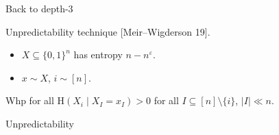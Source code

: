 \begin{frame}{Back to depth-$3$}

    Unpredictability technique [Meir--Wigderson 19].
    \pause
    \begin{itemize}
        \item $X \subseteq \{0, 1\}^n$ has entropy $n - n^{\varepsilon}$.
        \item $x \sim X$, $i \sim [n]$.
    \end{itemize}
    \pause
    Whp for all $\mathrm{H}(X_i \mid X_I = x_I) > 0$ for all $I \subseteq [n] \setminus \{i\}$, $|I| \ll
    n$.
\end{frame}

\begin{frame}{Unpredictability}
    
\end{frame}
